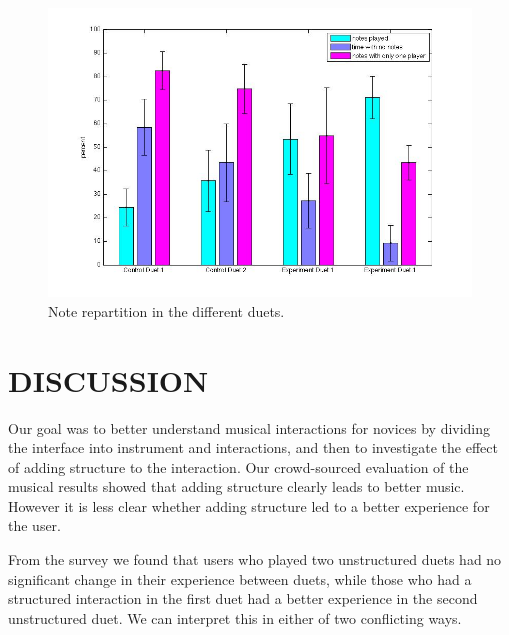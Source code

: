 \documentclass{article}
\begin{document}
\begin{figure}[tb]
\includegraphics[width=\columnwidth]{note_analysis_new.jpg}
\caption{Note repartition in the different duets.} 
\label{note-stats}
\end{figure}




\section{DISCUSSION}

Our goal was to better understand musical interactions for novices by dividing the interface into instrument and interactions, and then to investigate the effect of adding structure to the interaction.  Our crowd-sourced evaluation of the musical results showed that adding structure clearly leads to better music.  However it is less clear whether adding structure led to a better experience for the user.  

From the survey we found that users who played two unstructured duets had no significant change in their experience between duets, while those who had a structured interaction in the first duet had a better experience in the second unstructured duet. We can interpret this in either of two conflicting ways.
\end{document}

